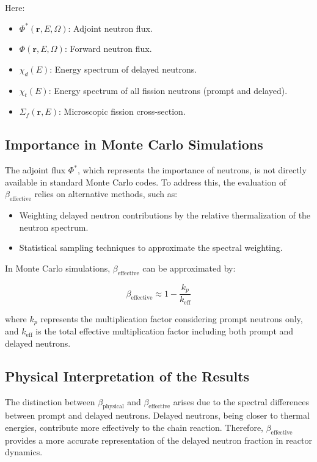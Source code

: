 {Here:
\begin{itemize}
    \item $\Phi^*(\mathbf{r}, E, \Omega)$: Adjoint neutron flux.
    \item $\Phi(\mathbf{r}, E, \Omega)$: Forward neutron flux.
    \item $\chi_d(E)$: Energy spectrum of delayed neutrons.
    \item $\chi_t(E)$: Energy spectrum of all fission neutrons (prompt and delayed).
    \item $\Sigma_f(\mathbf{r}, E)$: Microscopic fission cross-section.
\end{itemize}

\subsection{Importance in Monte Carlo Simulations}

The adjoint flux $\Phi^*$, which represents the importance of neutrons, is not directly available in standard Monte Carlo codes. To address this, the evaluation of $\beta_{\text{effective}}$ relies on alternative methods, such as:
\begin{itemize}
    \item Weighting delayed neutron contributions by the relative thermalization of the neutron spectrum.
    \item Statistical sampling techniques to approximate the spectral weighting.
\end{itemize}

In Monte Carlo simulations, $\beta_{\text{effective}}$ can be approximated by:

\[
\beta_{\text{effective}} \approx 1 - \frac{k_p}{k_{\text{eff}}}
\]

where $k_p$ represents the multiplication factor considering prompt neutrons only, and $k_{\text{eff}}$ is the total effective multiplication factor including both prompt and delayed neutrons.

\subsection{Physical Interpretation of the Results}

The distinction between $\beta_{\text{physical}}$ and $\beta_{\text{effective}}$ arises due to the spectral differences between prompt and delayed neutrons. Delayed neutrons, being closer to thermal energies, contribute more effectively to the chain reaction. Therefore, $\beta_{\text{effective}}$ provides a more accurate representation of the delayed neutron fraction in reactor dynamics.


}

